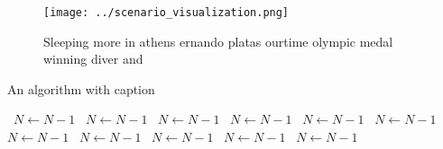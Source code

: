 \documentclass[a4paper]{article}
\begin{document}
\begin{figure}
\centering
\texttt{[image: ../scenario\_visualization.png]}
\caption{Sleeping more in athens ernando platas ourtime olympic medal winning diver and 
}
\end{figure}
 
\begin{algorithm}
\caption{An algorithm with caption}
\begin{algorithmic}
\    \State $N \gets N - 1$
\    \State $N \gets N - 1$
\    \State $N \gets N - 1$
\    \State $N \gets N - 1$
\    \State $N \gets N - 1$
\    \State $N \gets N - 1$
\    \State $N \gets N - 1$
\    \State $N \gets N - 1$
\    \State $N \gets N - 1$
\    \State $N \gets N - 1$
\    \State $N \gets N - 1$
\EndWhile
\end{algorithmic}
\end{algorithm}
\end{document}
